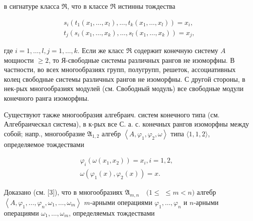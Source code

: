 \documentclass[10pt]{article}
\begin{document}
в сигнатуре класса $\Re$, что в классе $\Re$ истинны тождества



\[

\begin{aligned}

& s_{i}\left(t_{1}\left(x_{1}, \ldots, x_{l}\right), \ldots, t_{k}\left(x_{1}, \ldots, x_{l}\right)\right)=x_{i}, \\

& t_{j}\left(s_{i}\left(x_{1}, \ldots, x_{k}\right), \ldots, s_{l}\left(x_{1}, \ldots, x_{k}\right)\right)=x_{j},

\end{aligned}

\]



где $i=1, \ldots, l, j=1, \ldots, k$. Если же класс $\Re$ содержит конечную систему $A$ мощности $\geqslant 2$, то Я-свободные системы различных рангов не изоморфны. В частности, во всех многообразиях групп, полугрупп, решеток, ассоциативных колец свободные системы различных рангов не изоморфны. С другой стороны, в нек-рых многообразиях модулей (см. Свободный модуль) все свободные модули конечного ранга изоморфны.



Существуют также многообразия алгебраич. систем конечного типа (см. Алгебраическал система), в к-рых все С. а. с. конечных рангов изоморфны между собой; напр., многообразие $\mathfrak{A}_{1,2}$ алгебр $\left\langle A, \varphi_{1}, \varphi_{2}, \omega\right\rangle$ типа $\langle 1,1,2\rangle$, определяемое тождествами



\[

\begin{gathered}

\varphi_{i}\left(\omega\left(x_{1}, x_{2}\right)\right)=x_{i}, i=1,2, \\

\omega\left(\varphi_{1}(x), \varphi_{2}(x)\right)=x .

\end{gathered}

\]



Доказано (см. [3]), что в многообразиях $\mathfrak{A}_{m, n} \quad(1 \leqslant$ $\leqslant m<n)$ алгебр $\left\langle A, \varphi_{1}, \ldots, \varphi_{n}, \omega_{1}, \ldots, \omega_{m}\right\rangle$ $m$-арными операциями $\varphi_{1}, \ldots, \varphi_{n}$ и $n$-арными операциями $\omega_{1}, \ldots, \omega_{m}$, определяемых тождествами
\end{document}
